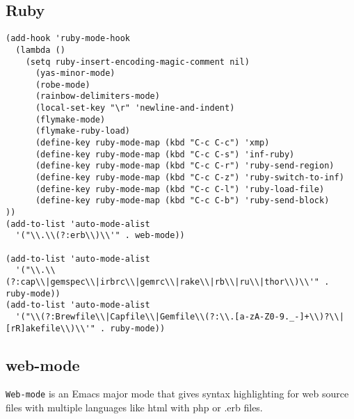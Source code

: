 \documentclass{article}
\begin{document}
\subsection{Ruby}
\label{sec-10-5}

\begin{verbatim}
(add-hook 'ruby-mode-hook
  (lambda ()
    (setq ruby-insert-encoding-magic-comment nil)
      (yas-minor-mode)
      (robe-mode)
      (rainbow-delimiters-mode)
      (local-set-key "\r" 'newline-and-indent)
      (flymake-mode)
      (flymake-ruby-load)
      (define-key ruby-mode-map (kbd "C-c C-c") 'xmp)
      (define-key ruby-mode-map (kbd "C-c C-s") 'inf-ruby)
      (define-key ruby-mode-map (kbd "C-c C-r") 'ruby-send-region)
      (define-key ruby-mode-map (kbd "C-c C-z") 'ruby-switch-to-inf)
      (define-key ruby-mode-map (kbd "C-c C-l") 'ruby-load-file)
      (define-key ruby-mode-map (kbd "C-c C-b") 'ruby-send-block)
))
(add-to-list 'auto-mode-alist
  '("\\.\\(?:erb\\)\\'" . web-mode))

(add-to-list 'auto-mode-alist
  '("\\.\\(?:cap\\|gemspec\\|irbrc\\|gemrc\\|rake\\|rb\\|ru\\|thor\\)\\'" . ruby-mode))
(add-to-list 'auto-mode-alist
  '("\\(?:Brewfile\\|Capfile\\|Gemfile\\(?:\\.[a-zA-Z0-9._-]+\\)?\\|[rR]akefile\\)\\'" . ruby-mode))
\end{verbatim}

\subsection{web-mode}
\label{sec-10-6}

\texttt{Web-mode} is an Emacs major mode that gives syntax highlighting for web source files with multiple languages like html with php or .erb files.
\end{document}
